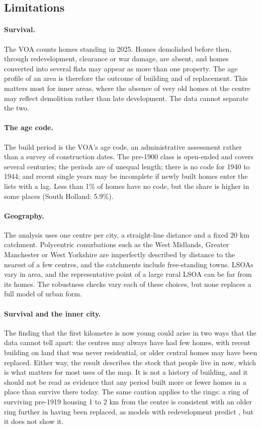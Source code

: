 \documentclass[11pt,a4paper]{article}
\begin{document}
\subsection{Limitations}
\paragraph{Survival.} The VOA counts homes standing in 2025. Homes demolished before then, through redevelopment, clearance \citep{yelling2000} or war damage, are absent, and homes converted into several flats may appear as more than one property. The age profile of an area is therefore the outcome of building and of replacement. This matters most for inner areas, where the absence of very old homes at the centre may reflect demolition rather than late development. The data cannot separate the two.

\paragraph{The age code.} The build period is the VOA's age code, an administrative assessment rather than a survey of construction dates. The pre-1900 class is open-ended and covers several centuries; the periods are of unequal length; there is no code for 1940 to 1944; and recent single years may be incomplete if newly built homes enter the lists with a lag. Less than 1\% of homes have no code, but the share is higher in some places (South Holland: 5.9\%).

\paragraph{Geography.} The analysis uses one centre per city, a straight-line distance and a fixed 20 km catchment. Polycentric conurbations such as the West Midlands, Greater Manchester or West Yorkshire are imperfectly described by distance to the nearest of a few centres, and the catchments include free-standing towns. LSOAs vary in area, and the representative point of a large rural LSOA can be far from its homes. The robustness checks vary each of these choices, but none replaces a full model of urban form.

\paragraph{Survival and the inner city.} The finding that the first kilometre is now young could arise in two ways that the data cannot tell apart: the centres may always have had few homes, with recent building on land that was never residential, or older central homes may have been replaced. Either way, the result describes the stock that people live in now, which is what matters for most uses of the map. It is not a history of building, and it should not be read as evidence that any period built more or fewer homes in a place than survive there today. The same caution applies to the rings: a ring of surviving pre-1919 housing 1 to 2 km from the centre is consistent with an older ring further in having been replaced, as models with redevelopment predict \citep{wheaton1982}, but it does not show it.
\end{document}
